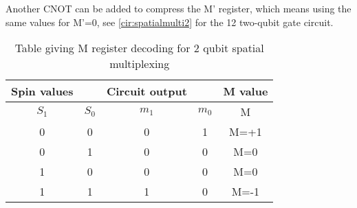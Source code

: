 Another CNOT can be added to compress the M' register, which means using the same values for M'=0, see \autoref{cir:spatialmulti2} for the 12 two-qubit gate circuit.

\begin{table}[H]
\begin{tabular}{ |c c|c c|c| } 
\hline
Spin values &&Circuit output &&M value \\
\hline
 $S_1$ &$S_0$ &$m_1$ &$m_0$ &M \\
\hline
 0 &0 &0 &1 &M=+1 \\ 
 0 &1 &0 &0 &M=0 \\ 
 1 &0 &0 &0 &M=0 \\ 
 1 &1 &1 &0 &M=-1 \\ 
\hline 
\end{tabular}
\caption{Table giving M register decoding for 2 qubit spatial multiplexing}
\label{fig:tab1}
\end{table}


